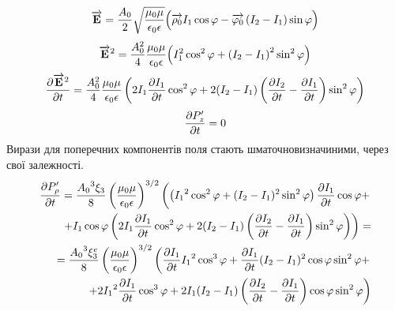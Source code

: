 %
\textcolor{lightgray}{ \begin{equation*} \label{eq:linear_e_cyl}
\overrightarrow{\mathbf E} = \frac{A_0}{2} \sqrt{\frac{\mu_0 \mu}{\epsilon_0 \epsilon}}
\Big( \overrightarrow{\mathbf \rho_0} I_1 \cos \varphi - 
\overrightarrow{\mathbf  \varphi_0 } \left( I_2 - I_1 \right) \sin \varphi \Big)
\end{equation*} }
%
\textcolor{lightgray}{ \begin{equation*} \begin{aligned}
\overrightarrow{\mathbf E}^2 = \frac{A_0^2}{4} \frac{\mu_0 \mu}{\epsilon_0 \epsilon}
\Big( I_1^2 \cos^2 \varphi + \left( I_2 - I_1 \right)^2 \sin^2 \varphi \Big)
\end{aligned} \end{equation*} }
%
\textcolor{lightgray}{ \begin{equation*} \begin{aligned}
\frac{\partial  \overrightarrow{\mathbf E}^2 }{\partial t} = \frac{A_0^2}{4} 
\frac{\mu_0 \mu}{\epsilon_0 \epsilon}
\left( 2 I_1 \frac{\partial I_1}{\partial t} \cos^2 \varphi + 
2 ( I_2 - I_1 ) \left( \frac{\partial I_2}{\partial t} - \frac{\partial I_1}{\partial t} \right) 
\sin^2 \varphi \right)
\end{aligned} \end{equation*} }
%
\begin{equation*} \begin{aligned}
\frac{\partial P_z^\prime}{\partial t} = 0
\end{aligned} \end{equation*}
%
Вирази для поперечних компонентів поля стають шматочновизначиними,
через свої залежності.
%
\textcolor{lightgray} { \begin{equation*} \begin{aligned}
\frac{\partial P_\rho^\prime}{\partial t}   = \frac{ {A_0}^3 \xi_3 }{ 8 } 
\left( \frac{\mu_0 \mu} {\epsilon_0 \epsilon} \right)^{3/2} \left(
\left( {I_1}^2 \cos^2 \varphi + ( I_2 - I_1 )^2 \sin^2 \varphi \right)
\frac{\partial I_1}{\partial t} \cos \varphi + \right. \\
\left. + I_1 \cos \varphi \left( 2 I_1 \frac{\partial I_1}{\partial t} \cos^2 \varphi + 
2 ( I_2 - I_1 ) \left( \frac{\partial I_2}{\partial t} - \frac{\partial I_1}{\partial t} \right) 
\sin^2 \varphi \right) \right) = \\ = \frac{ {A_0}^3 \xi_3^e }{ 8 } 
\left( \frac{\mu_0 \mu} {\epsilon_0 \epsilon} \right)^{3/2} \left(
\frac{\partial I_1}{\partial t} {I_1}^2 \cos^3 \varphi + \frac{\partial I_1}{\partial t} ( I_2 - I_1 )^2 
\cos \varphi \sin^2 \varphi + \right. \\
\left. + 2 {I_1}^2 \frac{\partial I_1}{\partial t} \cos^3 \varphi + 
2 I_1 ( I_2 - I_1 ) \left( \frac{\partial I_2}{\partial t} - \frac{\partial I_1}{\partial t} \right) 
\cos \varphi \sin^2 \varphi \right)
\end{aligned} \end{equation*} }
